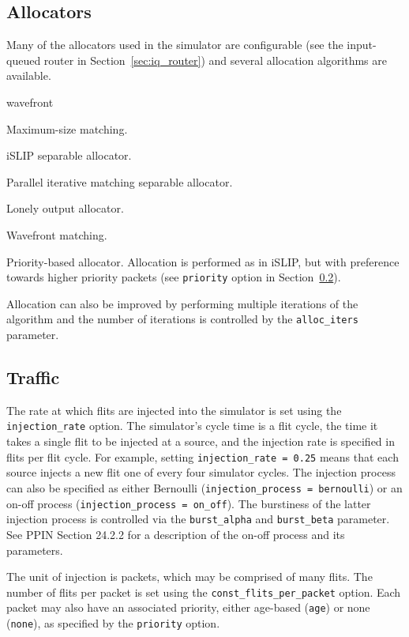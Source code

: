 \documentclass[11pt]{article}
\begin{document}
\subsection{Allocators}
\label{sec:alloc}

Many of the allocators used in the simulator are configurable (see
the input-queued router in Section~\ref{sec:iq_router}) and several
allocation algorithms are available.
\begin{opt_list}{wavefront}

\item[max\_size] Maximum-size matching. 
\item[islip] iSLIP separable allocator.
\item[pim] Parallel iterative matching separable allocator.
\item[loa] Lonely output allocator.
\item[wavefront] Wavefront matching.
\item[select] Priority-based allocator.  Allocation is performed as in
iSLIP, but with preference towards higher priority packets (see
\texttt{priority} option in Section~\ref{sec:traffic}).

\end{opt_list}

Allocation can also be improved by performing multiple iterations of
the algorithm and the number of iterations is controlled by the
\texttt{alloc\_iters} parameter.

\subsection{Traffic}
\label{sec:traffic}

The rate at which flits are injected into the simulator is set using
the \texttt{injection\_rate} option.  The simulator's cycle time is a
flit cycle, the time it takes a single flit to be injected at a
source, and the injection rate is specified in flits per flit cycle.
For example, setting \texttt{injection\_rate = 0.25} means that each
source injects a new flit one of every four simulator cycles.  The
injection process can also be specified as either Bernoulli
(\texttt{injection\_process = bernoulli}) or an on-off process
(\texttt{injection\_process = on\_off}).  The burstiness of the latter
injection process is controlled via the \texttt{burst\_alpha} and
\texttt{burst\_beta} parameter.  See PPIN Section 24.2.2 for a
description of the on-off process and its parameters.

The unit of injection is packets, which may be comprised of many
flits.  The number of flits per packet is set using the
\texttt{const\_flits\_per\_packet} option.  Each packet may also have an
associated priority, either age-based (\texttt{age}) or none
(\texttt{none}), as specified by the \texttt{priority} option.
\end{document}
